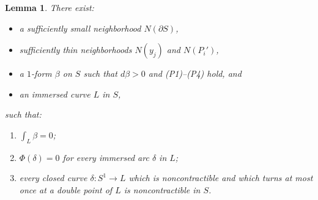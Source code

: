 \documentclass[10pt]{amsart}
\theoremstyle{plain}
\newtheorem{lemma}[thm]{Lemma}
\theoremstyle{definition}
\numberwithin{equation}{subsection}
\newcommand{\bdry}{\partial}
\begin{document}
\begin{lemma}\label{lemma: technical}
There exist:
\begin{itemize}
\item a sufficiently small neighborhood $N(\bdry S)$,
\item sufficiently thin neighborhoods $N(y_j)$ and $N(P_i')$,
\item a $1$-form $\beta$ on $S$ such that $d\beta>0$ and {\em (P1)--(P4)} hold, and
\item an immersed curve $L$ in $S$,
\end{itemize}
such that:
\begin{enumerate}\renewcommand{\theenumi}{\Alph{enumi}}
\item\label{enum:A}
$\int_{L} \beta =0$;
\item\label{enum:B}
$\Phi (\delta) =0$ for every immersed arc $\delta$ in $L$;
\item\label{enum:C}
every closed curve $\delta:S^1\to L$ which is noncontractible and which turns at most once at a double point of $L$ is noncontractible in $S$.
\end{enumerate}
\end{lemma}
\end{document}
